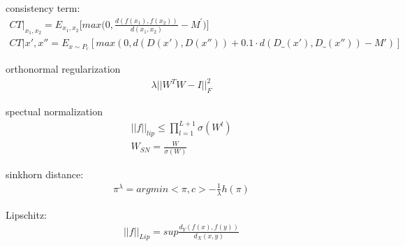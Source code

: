 \documentclass[letterpaper]{article} %
\begin{document}
consistency term:
\begin{align*}
CT|_{x_1,x_2} = E_{x_1,x_2}\bigg[max\bigg(0,\frac{d(f(x_1),f(x_2))}{d(x_1,x_2)}-M^{'}\bigg)\bigg] \\
CT|{x',x''} = E_{x\sim P_r}[max(0,d(D(x'),D(x''))+0.1\cdot d(D\_(x'),D\_(x''))-M')]
\end{align*}	

orthonormal regularization
\begin{align*}
\lambda ||W^TW-I||^2_F
\end{align*}

spectual normalization
\begin{align*}
||f||_{lip}\le \prod_{l=1}^{L+1}\sigma(W^l)\\
W_{SN} = \frac{W}{\sigma(W)} 
\end{align*}

	
sinkhorn distance:
\begin{align*}
\pi^\lambda = argmin<\pi,c>-\frac1\lambda h(\pi)
\end{align*}	
	
Lipschitz:
\begin{align*}
||f||_{Lip} = sup\frac{d_Y(f(x),f(y))}{d_X(x,y)}
\end{align*}
	
	
	
	
	
	
	
	


	
	
	
	
\end{document}
